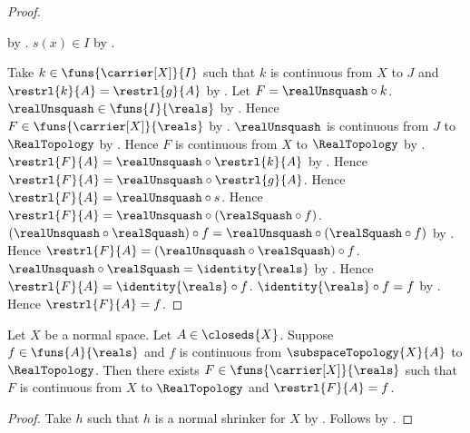 \begin{proof}
\begin{subproof}
            by
            .
        $s(x)\in I$ by .
    \end{subproof}
    Take $k\in\funs{\carrier[X]}{I}$ such that
        $k$ is continuous from $X$ to $J$ and
        $\restrl{k}{A}=\restrl{g}{A}$
        by
        .
    Let $F=\realUnsquash\circ k$.
    $\realUnsquash\in\funs{I}{\reals}$
        by .
    Hence $F\in\funs{\carrier[X]}{\reals}$ by .
    $\realUnsquash$ is continuous from $J$ to $\RealTopology$
        by .
    Hence $F$ is continuous from $X$ to $\RealTopology$
        by .
    $\restrl{F}{A}=\realUnsquash\circ\restrl{k}{A}$
        by .
    Hence $\restrl{F}{A}=\realUnsquash\circ\restrl{g}{A}$.
    Hence $\restrl{F}{A}=\realUnsquash\circ s$.
    Hence $\restrl{F}{A}=\realUnsquash\circ(\realSquash\circ f)$.
    $(\realUnsquash\circ\realSquash)\circ f
        =\realUnsquash\circ(\realSquash\circ f)$
        by .
    Hence $\restrl{F}{A}=(\realUnsquash\circ\realSquash)\circ f$.
    $\realUnsquash\circ\realSquash=\identity{\reals}$
        by .
    Hence $\restrl{F}{A}=\identity{\reals}\circ f$.
    $\identity{\reals}\circ f=f$
        by .
    Hence $\restrl{F}{A}=f$.
\end{proof}

\begin{theorem}\label{tietze_extension_real}
    Let $X$ be a normal space.
    Let $A\in\closeds{X}$.
    Suppose $f\in\funs{A}{\reals}$ and $f$ is continuous from
        $\subspaceTopology{X}{A}$ to $\RealTopology$.
    Then there exists $F\in\funs{\carrier[X]}{\reals}$ such that
        $F$ is continuous from $X$ to $\RealTopology$ and
        $\restrl{F}{A}=f$.
\end{theorem}
\begin{proof}
    Take $h$ such that $h$ is a normal shrinker for $X$
        by .
    Follows by .
\end{proof}
